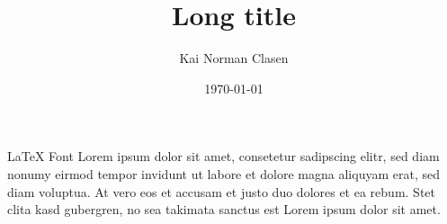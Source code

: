 \documentclass[aspectratio=169]{beamer}
\title[\LaTeX{} Font]{Long title}
\author{Kai Norman Clasen}
\institute{}
\date{\today}
\begin{document}
\begin{frame}{\LaTeX{} Font}
    Lorem ipsum dolor sit amet, consetetur sadipscing elitr,
    sed diam nonumy eirmod tempor invidunt ut labore et dolore
    magna aliquyam erat, sed diam voluptua.
    At vero eos et accusam et justo duo dolores et ea rebum.
    Stet clita kasd gubergren, no sea takimata sanctus est
    Lorem ipsum dolor sit amet.
\end{frame}
\end{document}
